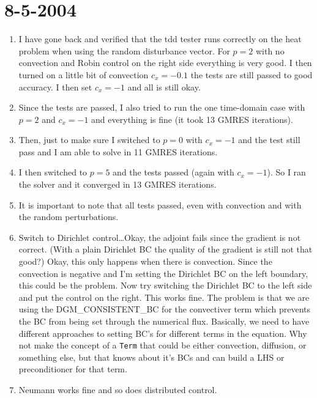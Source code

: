 \documentclass[12pt]{article}
\begin{document}
\section*{8-5-2004}
\begin{enumerate}
\item I have gone back and verified that the tdd tester runs correctly on the
  heat problem when using the random disturbance vector.  For $p=2$ with no
  convection and Robin control on the right side everything is very good.  I
  then turned on a little bit of convection $c_x=-0.1$ the tests are still
  passed to good accuracy.  I then set $c_x=-1$ and all is still okay.
\item Since the tests are passed, I also tried to run the one time-domain case
  with $p=2$ and $c_x=-1$ and everything is fine (it took 13 GMRES
  iterations).
\item Then, just to make sure I switched to $p=0$ with $c_x=-1$ and the test
  still pass and I am able to solve in 11 GMRES iterations.
\item I then switched to $p=5$ and the tests passed (again with $c_x=-1$).  So
  I ran the solver and it converged in 13 GMRES iterations.
\item It is important to note that all tests passed, even with convection and
  with the random perturbations.
\item Switch to Dirichlet control\dots Okay, the adjoint fails since the
  gradient is not correct. (With a plain Dirichlet BC the quality of the
  gradient is still not that good?)  Okay, this only happens when there is
  convection.  Since the convection is negative and I'm setting the Dirichlet
  BC on the left boundary, this could be the problem.  Now try switching the
  Dirichlet BC to the left side and put the control on the right.  This works
  fine.  The problem is that we are using the DGM\_CONSISTENT\_BC for the
  convectiver term which prevents the BC from being set through the numerical
  flux.  Basically, we need to have different approaches to setting BC's for
  different terms in the equation.  Why not make the concept of a {\tt Term}
  that could be either convection, diffusion, or something else, but that
  knows about it's BCs and can build a LHS or preconditioner for that term.
\item Neumann works fine and so does distributed control.
\end{enumerate}
\end{document}
